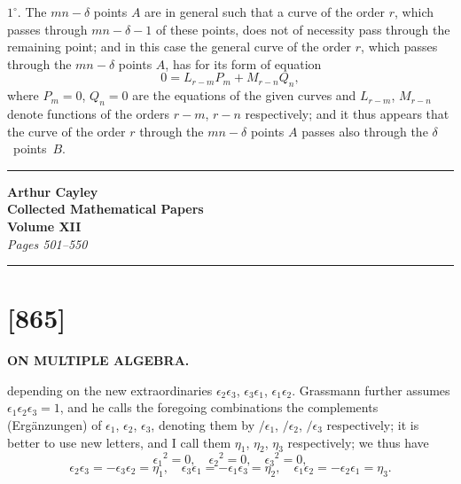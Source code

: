 \documentclass[11pt,a4paper]{book}
\begin{document}
$1^\circ$. The $mn - \delta$ points $A$ are in general such that a curve of the order $r$, which passes through $mn - \delta - 1$ of these points, does not of necessity pass through the remaining point; and in this case the general curve of the order $r$, which passes through the $mn - \delta$ points $A$, has for its form of equation
\[0 = L_{r-m}P_m + M_{r-n}Q_n,\]
where $P_m = 0$, $Q_n = 0$ are the equations of the given curves and $L_{r-m}$, $M_{r-n}$ denote functions of the orders $r - m$, $r - n$ respectively; and it thus appears that the curve of the order $r$ through the $mn - \delta$ points $A$ passes also through the $\delta$~points~$B$.

\vspace{12pt}
\hrule
\clearpage


\begin{center}
\Large\textbf{Arthur Cayley}\\[6pt]
\LARGE\textbf{Collected Mathematical Papers}\\[4pt]
\Large\textbf{Volume XII}\\[8pt]
\large\textit{Pages 501--550}
\end{center}

\vspace{1em}
\hrule
\vspace{2em}

\newpage
\section*{[865]}
\begin{center}
\large\textbf{ON MULTIPLE ALGEBRA.}
\end{center}

\setcounter{equation}{0}
\noindent[865

\vspace{-1em}]
depending on the new extraordinaries $\epsilon_2 \epsilon_3$, $\epsilon_3 \epsilon_1$, $\epsilon_1 \epsilon_2$.
Grassmann further assumes $\epsilon_1 \epsilon_2 \epsilon_3 = 1$, and he calls the foregoing
combinations the complements (Erg\"anzungen) of $\epsilon_1$, $\epsilon_2$, $\epsilon_3$, denoting
them by $/\epsilon_1$, $/\epsilon_2$, $/\epsilon_3$ respectively; it is better to use new letters,
and I call them $\eta_1$, $\eta_2$, $\eta_3$ respectively; we thus have
\[
\epsilon_1{}^2 = 0, \quad \epsilon_2{}^2 = 0, \quad \epsilon_3{}^2 = 0,
\]
\[
\epsilon_2 \epsilon_3 = - \epsilon_3 \epsilon_2 = \eta_1, \quad
\epsilon_3 \epsilon_1 = - \epsilon_1 \epsilon_3 = \eta_2, \quad
\epsilon_1 \epsilon_2 = - \epsilon_2 \epsilon_1 = \eta_3.
\]
\end{document}

